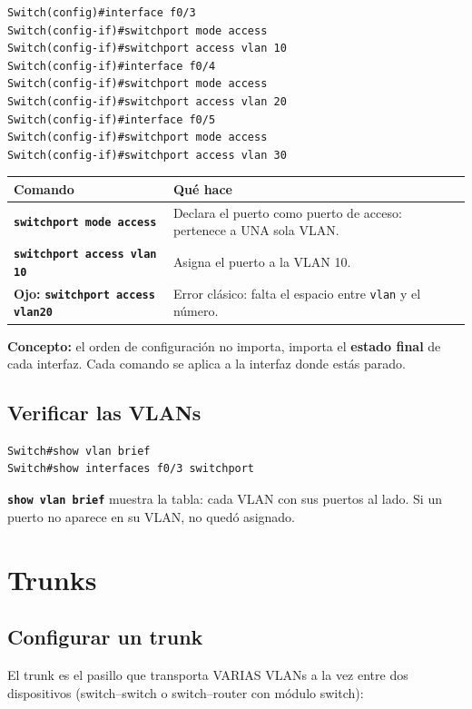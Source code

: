 \documentclass[11pt,a4paper]{report}
\newcommand{\cmd}[1]{\texttt{\textbf{#1}}}
\begin{document}
\begin{lstlisting}
Switch(config)#interface f0/3
Switch(config-if)#switchport mode access
Switch(config-if)#switchport access vlan 10
Switch(config-if)#interface f0/4
Switch(config-if)#switchport mode access
Switch(config-if)#switchport access vlan 20
Switch(config-if)#interface f0/5
Switch(config-if)#switchport mode access
Switch(config-if)#switchport access vlan 30
\end{lstlisting}

\begin{longtable}{@{}p{7cm}p{8.5cm}@{}}
\toprule
\textbf{Comando} & \textbf{Qué hace} \\
\midrule
\endhead
\cmd{switchport mode access} & Declara el puerto como puerto de acceso: pertenece a UNA sola VLAN. \\
\addlinespace
\cmd{switchport access vlan 10} & Asigna el puerto a la VLAN 10. \\
\addlinespace
\textbf{Ojo:} \cmd{switchport access vlan20} & Error clásico: falta el espacio entre \texttt{vlan} y el número. \\
\bottomrule
\end{longtable}

\textbf{Concepto:} el orden de configuración no importa, importa el \textbf{estado final} de cada interfaz. Cada comando se aplica a la interfaz donde estás parado.

\section{Verificar las VLANs}

\begin{lstlisting}
Switch#show vlan brief
Switch#show interfaces f0/3 switchport
\end{lstlisting}

\cmd{show vlan brief} muestra la tabla: cada VLAN con sus puertos al lado. Si un puerto no aparece en su VLAN, no quedó asignado.

\chapter{Trunks}

\section{Configurar un trunk}

El trunk es el pasillo que transporta VARIAS VLANs a la vez entre dos dispositivos (switch--switch o switch--router con módulo switch):
\end{document}
